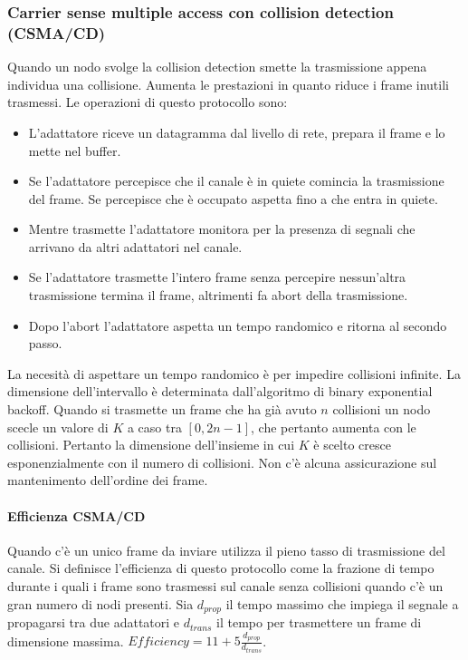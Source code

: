 \subsubsection{Carrier sense multiple access con collision detection (CSMA/CD)}
Quando un nodo svolge la collision detection smette la trasmissione appena individua una collisione. Aumenta le prestazioni in quanto riduce i frame inutili trasmessi. Le operazioni di questo protocollo sono:
\begin{itemize}
\item L'adattatore riceve un datagramma dal livello di rete, prepara il frame e lo mette nel buffer.
\item Se l'adattatore percepisce che il canale \`e in quiete comincia la trasmissione del frame. Se percepisce che \`e occupato aspetta fino a che entra in quiete.
\item Mentre trasmette l'adattatore monitora per la presenza di segnali che arrivano da altri adattatori nel canale.
\item Se l'adattatore trasmette l'intero frame senza percepire nessun'altra trasmissione termina il frame, altrimenti fa abort della trasmissione.
\item Dopo l'abort l'adattatore aspetta un tempo randomico e ritorna al secondo passo.
\end{itemize}
La necesit\`a di aspettare un tempo randomico \`e per impedire collisioni infinite. La dimensione dell'intervallo \`e determinata dall'algoritmo di binary exponential backoff. Quando si trasmette un frame che ha
gi\`a avuto $n$ collisioni un nodo scecle un valore di $K$ a caso tra $[0,2n-1]$, che pertanto aumenta con le collisioni. Pertanto la dimensione dell'insieme in cui $K$ \`e scelto cresce esponenzialmente con il 
numero di collisioni. Non c'\`e alcuna assicurazione sul mantenimento dell'ordine dei frame. 
\paragraph{Efficienza CSMA/CD}
Quando c'\`e un unico frame da inviare utilizza il pieno tasso di trasmissione del canale. Si definisce l'efficienza di questo protocollo come la frazione di tempo durante i quali i frame sono trasmessi sul canale
senza collisioni quando c'\`e un gran numero di nodi presenti. Sia $d_{prop}$ il tempo massimo che impiega il segnale a propagarsi tra due adattatori e $d_{trans}$ il tempo per trasmettere un frame di 
dimensione massima. $Efficiency = 11 + 5\frac{d_{prop}}{d_{trans}}$. 
